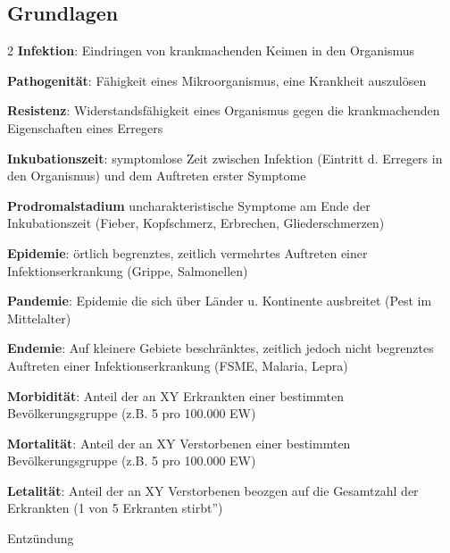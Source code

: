 \documentclass{article}
\newcommand\gT[1]{\textbf{\textup{\textcolor[rgb]{0.0,0.5019608,0.0}{#1}}}}
\newcommand\gZ[1]{\textcolor[rgb]{0.5019608,0.5019608,0.5019608}{#1}}
\begin{document}
\subsection{Grundlagen}
\begin{multicols}{2}
{\mdseries
{}\gT{Infektion}: Eindringen von
krankmachenden Keimen in den Organismus}

{\mdseries
{}\gT{Pathogenit\"at}:
\gZ{F\"ahigkeit eines Mikroorganismus, eine Krankheit
auszul\"osen}}

{\mdseries
{}\gT{Resistenz}: Widerstandsf\"ahigkeit
eines Organismus gegen die  krankmachenden  Eigenschaften eines
Erregers}

{\mdseries
{}\gT{Inkubationszeit}: symptomlose
Zeit zwischen Infektion (Eintritt d. Erregers in den Organismus) und
dem Auftreten erster Symptome}

{\mdseries
{}\gT{\textcolor[rgb]{0.7529412,0.7529412,0.7529412}{Prodromalstadium}}
 \gZ{uncharakteristische Symptome am Ende der
Inkubationszeit (Fieber, Kopfschmerz, Erbrechen, Gliederschmerzen)}}

{\mdseries
{}\gT{Epidemie}: \"ortlich begrenztes,
zeitlich vermehrtes Auftreten einer  Infektionserkrankung (Grippe,
Salmonellen)}

{\mdseries
{}\gT{\textcolor[rgb]{0.7529412,0.7529412,0.7529412}{Pandemie}}:
\gZ{Epidemie die sich \"uber L\"ander u. Kontinente
ausbreitet (Pest im Mittelalter)}}

{\mdseries
{}\gT{\textcolor[rgb]{0.7529412,0.7529412,0.7529412}{Endemie}}:
\gZ{Auf kleinere Gebiete beschr\"anktes, zeitlich
jedoch nicht begrenztes Auftreten einer Infektionserkrankung  (FSME,
Malaria, Lepra)}}

{\mdseries
{}\gT{\textcolor[rgb]{0.7529412,0.7529412,0.7529412}{Morbidit\"at}}:
\gZ{Anteil der an XY Erkrankten einer bestimmten
Bev\"olkerungsgruppe (z.B. 5 pro 100.000 EW)}}

{\mdseries
{}\gT{\textcolor[rgb]{0.7529412,0.7529412,0.7529412}{Mortalit\"at}}:
A\gZ{nteil der an XY Verstorbenen einer bestimmten
Bev\"olkerungsgruppe (z.B. 5 pro 100.000 EW)}}

{\mdseries
{}\gT{Letalit\"at}:  Anteil der an XY
Verstorbenen beozgen auf die Gesamtzahl der Erkrankten
({\quotedblbase}1 von 5 Erkranten stirbt{\textquotedblright})}

\end{multicols}
{\mdseries\color{black}
Entz\"undung}
\end{document}
